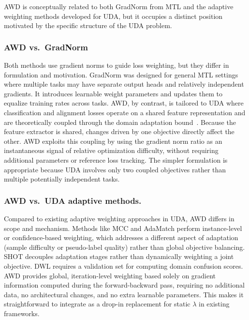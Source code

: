 \documentclass[pdflatex,sn-mathphys-num]{sn-jnl}
\theoremstyle{thmstyleone}
\theoremstyle{thmstyletwo}
\theoremstyle{thmstylethree}
\begin{document}
AWD is conceptually related to both GradNorm from MTL and the adaptive weighting methods developed for UDA, but it occupies a distinct position motivated by the specific structure of the UDA problem.

\subsubsection{\texorpdfstring{AWD vs.\ GradNorm}{AWD vs. GradNorm}}
Both methods use gradient norms to guide loss weighting, but they differ in formulation and motivation. GradNorm was designed for general MTL settings where multiple tasks may have separate output heads and relatively independent gradients. It introduces learnable weight parameters and updates them to equalize training rates across tasks. AWD, by contrast, is tailored to UDA where classification and alignment losses operate on a shared feature representation and are theoretically coupled through the domain adaptation bound~\cite{bendavid2010theory}. Because the feature extractor is shared, changes driven by one objective directly affect the other. AWD exploits this coupling by using the gradient norm ratio as an instantaneous signal of relative optimization difficulty, without requiring additional parameters or reference loss tracking. The simpler formulation is appropriate because UDA involves only two coupled objectives rather than multiple potentially independent tasks.

\subsubsection{AWD vs.\ UDA adaptive methods.}
Compared to existing adaptive weighting approaches in UDA, AWD differs in scope and mechanism. Methods like MCC and AdaMatch perform instance-level or confidence-based weighting, which addresses a different aspect of adaptation (sample difficulty or pseudo-label quality) rather than global objective balancing. SHOT decouples adaptation stages rather than dynamically weighting a joint objective. DWL requires a validation set for computing domain confusion scores. AWD provides global, iteration-level weighting based solely on gradient information computed during the forward-backward pass, requiring no additional data, no architectural changes, and no extra learnable parameters. This makes it straightforward to integrate as a drop-in replacement for static $\lambda$ in existing frameworks.
\end{document}
